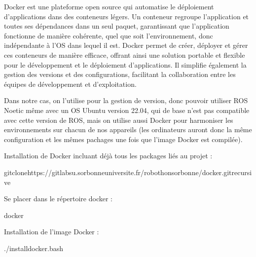 \documentclass[letterpaper,10pt,english]{sphinxmanual}
\begin{document}
\sphinxAtStartPar
{}

\sphinxAtStartPar
Docker est une plateforme open source qui automatise le déploiement d’applications dans des conteneurs légers. Un conteneur regroupe l’application et toutes ses dépendances dans un seul paquet, garantissant que l’application fonctionne de manière cohérente, quel que soit l’environnement, donc indépendante à l’OS dans lequel il est. Docker permet de créer, déployer et gérer ces conteneurs de manière efficace, offrant ainsi une solution portable et flexible pour le développement et le déploiement d’applications. Il simplifie également la gestion des versions et des configurations, facilitant la collaboration entre les équipes de développement et d’exploitation.

\sphinxAtStartPar
Dans notre cas, on l’utilise pour la gestion de version, donc pouvoir utiliser ROS Noetic même avec un OS Ubuntu version 22.04, qui de base n’est pas compatible avec cette version de ROS, mais on utilise aussi Docker pour harmoniser les environnements sur chacun de nos appareils (les ordinateurs auront donc la même configuration et les mêmes pachages une fois que l’image Docker est compilée).

\sphinxAtStartPar
{}

\sphinxAtStartPar
Installation de Docker incluant déjà tous les packages liés au projet :

\begin{sphinxVerbatim}[commandchars=\\\{\}]
\PYGZdl{}gitclonehttps://gitlabsu.sorbonne\PYGZhy{}universite.fr/robothon\PYGZhy{}sorbonne/docker.git\PYGZhy{}\PYGZhy{}recursive
\end{sphinxVerbatim}

\sphinxAtStartPar
Se placer dans le répertoire docker :

\begin{sphinxVerbatim}[commandchars=\\\{\}]
\PYGZdl{}docker
\end{sphinxVerbatim}

\sphinxAtStartPar
Installation de l’image Docker :

\begin{sphinxVerbatim}[commandchars=\\\{\}]
\PYGZdl{}./install\PYGZus{}docker.bash
\end{sphinxVerbatim}
\end{document}
